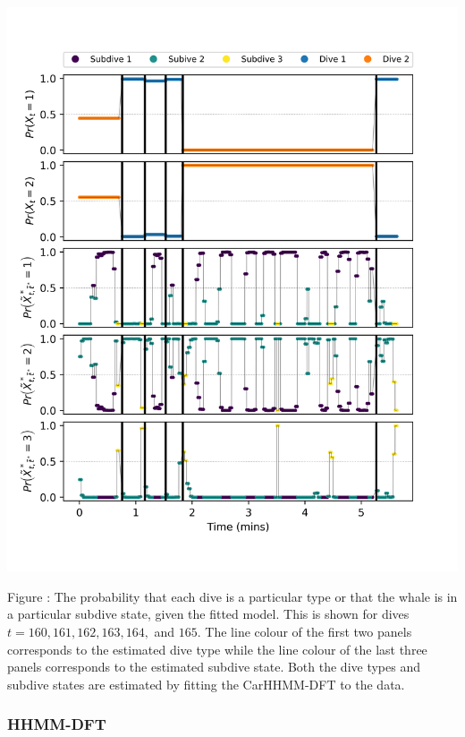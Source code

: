 \documentclass{article}
\begin{document}
        \begin{center}
        \includegraphics[width=6in]{../Plots/CarHHMM2_decoded_states.png}
        \end{center}
        
        \noindent Figure : The probability that each dive is a particular type or that the whale is in a particular subdive state, given the fitted model. This is shown for dives $t = 160,161,162,163,164,$ and $165$. The line colour of the first two panels corresponds to the estimated dive type while the line colour of the last three panels corresponds to the estimated subdive state. Both the dive types and subdive states are estimated by fitting the CarHHMM-DFT to the data.
        \addtocounter{fignum}{1}
        
        \subsubsection{HHMM-DFT}
        
\end{document}
